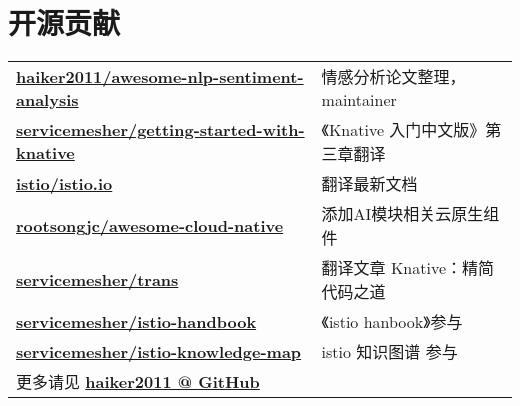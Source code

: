 \documentclass[]{deedy-resume-openfont}
\begin{document}
\begin{minipage}[t]{0.68\textwidth}




\section{开源贡献}
\begin{tabular}{ll}
\href{https://github.com/haiker2011/awesome-nlp-sentiment-analysis/commits?author=haiker2011}{\bf haiker2011/awesome-nlp-sentiment-analysis} & 情感分析论文整理，maintainer \\
\href{https://github.com/servicemesher/getting-started-with-knative/commits?author=haiker2011}{\bf servicemesher/getting-started-with-knative} & 《Knative 入门中文版》第三章翻译 \\
\href{https://github.com/istio/istio.io/commits?author=haiker2011}{\bf istio/istio.io} & 翻译最新文档  \\
\href{https://github.com/rootsongjc/awesome-cloud-native/commits?author=haiker2011}{\bf rootsongjc/awesome-cloud-native} & 添加AI模块相关云原生组件 \\
\href{https://github.com/servicemesher/trans/commits?author=haiker2011}{\bf servicemesher/trans} & 翻译文章 Knative：精简代码之道 \\
\href{https://github.com/servicemesher/istio-handbook/commits?author=haiker2011}{\bf servicemesher/istio-handbook} & 《istio hanbook》参与 \\
\href{https://github.com/servicemesher/istio-knowledge-map/commits?author=haiker2011}{\bf servicemesher/istio-knowledge-map} & istio 知识图谱 参与 \\
更多请见 \href{https://github.com/haiker2011}{\bf haiker2011 @ GitHub} & \\
\end{tabular}
\sectionsep


\end{minipage} 
\end{document}
